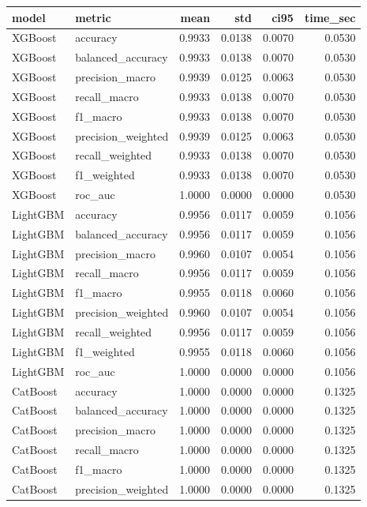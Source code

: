 \begin{tabular}{llrrrr}
\toprule
model & metric & mean & std & ci95 & time_sec \\
\midrule
XGBoost & accuracy & 0.9933 & 0.0138 & 0.0070 & 0.0530 \\
XGBoost & balanced_accuracy & 0.9933 & 0.0138 & 0.0070 & 0.0530 \\
XGBoost & precision_macro & 0.9939 & 0.0125 & 0.0063 & 0.0530 \\
XGBoost & recall_macro & 0.9933 & 0.0138 & 0.0070 & 0.0530 \\
XGBoost & f1_macro & 0.9933 & 0.0138 & 0.0070 & 0.0530 \\
XGBoost & precision_weighted & 0.9939 & 0.0125 & 0.0063 & 0.0530 \\
XGBoost & recall_weighted & 0.9933 & 0.0138 & 0.0070 & 0.0530 \\
XGBoost & f1_weighted & 0.9933 & 0.0138 & 0.0070 & 0.0530 \\
XGBoost & roc_auc & 1.0000 & 0.0000 & 0.0000 & 0.0530 \\
LightGBM & accuracy & 0.9956 & 0.0117 & 0.0059 & 0.1056 \\
LightGBM & balanced_accuracy & 0.9956 & 0.0117 & 0.0059 & 0.1056 \\
LightGBM & precision_macro & 0.9960 & 0.0107 & 0.0054 & 0.1056 \\
LightGBM & recall_macro & 0.9956 & 0.0117 & 0.0059 & 0.1056 \\
LightGBM & f1_macro & 0.9955 & 0.0118 & 0.0060 & 0.1056 \\
LightGBM & precision_weighted & 0.9960 & 0.0107 & 0.0054 & 0.1056 \\
LightGBM & recall_weighted & 0.9956 & 0.0117 & 0.0059 & 0.1056 \\
LightGBM & f1_weighted & 0.9955 & 0.0118 & 0.0060 & 0.1056 \\
LightGBM & roc_auc & 1.0000 & 0.0000 & 0.0000 & 0.1056 \\
CatBoost & accuracy & 1.0000 & 0.0000 & 0.0000 & 0.1325 \\
CatBoost & balanced_accuracy & 1.0000 & 0.0000 & 0.0000 & 0.1325 \\
CatBoost & precision_macro & 1.0000 & 0.0000 & 0.0000 & 0.1325 \\
CatBoost & recall_macro & 1.0000 & 0.0000 & 0.0000 & 0.1325 \\
CatBoost & f1_macro & 1.0000 & 0.0000 & 0.0000 & 0.1325 \\
CatBoost & precision_weighted & 1.0000 & 0.0000 & 0.0000 & 0.1325 \\

\end{tabular}

